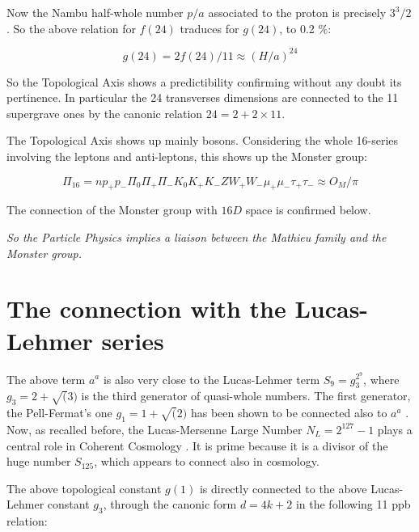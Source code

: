 \documentclass[a4paper,9pt]{article}
\begin{document}
Now the Nambu half-whole number $p/a$ associated to the proton is precisely $3^3/2$. So the above relation for $f(24)$ traduces for $g(24)$, to 0.2 \%:

\begin{equation}
g(24) =  2f(24)/11 \approx (H/a)^{24}
\end{equation}

So the Topological Axis shows a predictibility confirming without any doubt its pertinence. In particular the 24 transverses dimensions are connected to the 11 supergrave ones by the canonic relation $24 = 2 + 2\times 11$.

The Topological Axis shows up mainly bosons. Considering the whole 16-series involving the leptons and anti-leptons, this shows up the Monster group:

\begin{equation}
\Pi_{16} = n p_+ p_-  \Pi_0   \Pi_+    \Pi_-  K_0  K_+  K_- Z   W_+  W_- \mu_+ \mu_- \tau_+ \tau_- \approx O_M /\pi
\end{equation}

The connection of the Monster group with $16D$ space is confirmed below.

\textit {So the Particle Physics implies a liaison between the Mathieu family and the Monster group.}












\section{The connection with the Lucas-Lehmer series}

The above term $a^a$ is also very close to the Lucas-Lehmer term $S_9 = g_3^{2^9}$, where $ g_3 = 2 + \sqrt(3)$ is the third generator of quasi-whole numbers. The first generator, the Pell-Fermat's one $g_1 = 1 + \sqrt(2)$ has been shown to be connected also to $a^a$ \cite{Sanchez}. Now, as recalled before, the Lucas-Mersenne Large Number $N_L = 2^{127} - 1$ plays a central role in Coherent Cosmology \cite{Sanchez}. It is prime because it is a divisor of the huge number $S_{125}$, which appears to connect also in cosmology.

The above topological constant $g(1)$ is directly connected to the above Lucas-Lehmer constant $g_3$, through the canonic form $d = 4k+2$ in the following 11 ppb relation:
\end{document}

